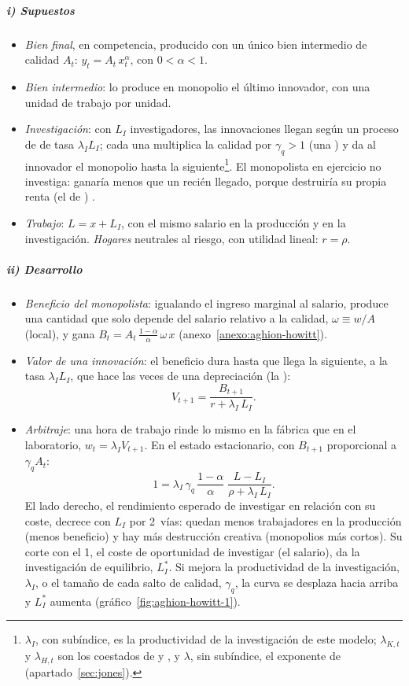 \documentclass[11pt]{article}
\begin{document}
\subparagraph{i) Supuestos}

\begin{itemize}
\item \emph{Bien final}, en competencia, producido con un único bien intermedio de calidad $A_t$: $y_t=A_t\,x_t^{\alpha}$, con $0<\alpha<1$.
\item \emph{Bien intermedio}: lo produce en monopolio el último innovador, con una unidad de trabajo por unidad.
\item \emph{Investigación}: con $L_I$ investigadores, las innovaciones llegan según un proceso de  de tasa $\lambda_IL_I$; cada una multiplica la calidad por $\gamma_q>1$ (una ) y da al innovador el monopolio hasta la siguiente\footnote{$\lambda_I$, con subíndice, es la productividad de la investigación de este modelo; $\lambda_{K,t}$ y $\lambda_{H,t}$ son los coestados de  y , y $\lambda$, sin subíndice, el exponente de  (apartado~\ref{sec:jones}).}. El monopolista en ejercicio no investiga: ganaría menos que un recién llegado, porque destruiría su propia renta (el  de \textcite{Arrow1962Economic}) .
\item \emph{Trabajo}: $L=x+L_I$, con el mismo salario en la producción y en la investigación. \emph{Hogares} neutrales al riesgo, con utilidad lineal: $r=\rho$.
\end{itemize}

\subparagraph{ii) Desarrollo}

\begin{itemize}
\item \emph{Beneficio del monopolista}: igualando el ingreso marginal al salario, produce una cantidad que solo depende del salario relativo a la calidad, $\omega\equiv w/A$ (local), y gana $B_{t}=A_t\,\frac{1-\alpha}{\alpha}\,\omega\,x$ (anexo~\ref{anexo:aghion-howitt}).
\item \emph{Valor de una innovación}: el beneficio dura hasta que llega la siguiente, a la tasa $\lambda_IL_I$, que hace las veces de una depreciación (la ):
  \[V_{t+1}=\frac{B_{t+1}}{r+\lambda_I\,L_I}.\]
\item \emph{Arbitraje}: una hora de trabajo rinde lo mismo en la fábrica que en el laboratorio, $w_t=\lambda_IV_{t+1}$. En el estado estacionario, con $B_{t+1}$ proporcional a $\gamma_qA_t$:
  \begin{equation}
  1=\lambda_I\,\gamma_q\,\frac{1-\alpha}{\alpha}\;\frac{L-L_I}{\rho+\lambda_I\,L_I}.\label{eq:ah-arbitraje}
  \end{equation}
  El lado derecho, el rendimiento esperado de investigar en relación con su coste, decrece con $L_I$ por 2~vías: quedan menos trabajadores en la producción (menos beneficio) y hay más destrucción creativa (monopolios más cortos). Su corte con el 1, el coste de oportunidad de investigar (el salario), da la investigación de equilibrio, $L_I^*$. Si mejora la productividad de la investigación, $\lambda_I$, o el tamaño de cada salto de calidad, $\gamma_q$, la curva se desplaza hacia arriba y $L_I^*$ aumenta (gráfico~\ref{fig:aghion-howitt-1}).
\end{itemize}
\end{document}
